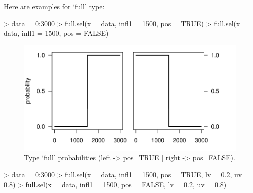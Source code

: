 \documentclass[letterpaper, 12pt]{article}
\begin{document}

\newpage

Here are examples for `full' type:
\begin{Schunk}
\begin{Sinput}
> data = 0:3000
> full.sel(x = data, infl1 = 1500, pos = TRUE)
> full.sel(x = data, infl1 = 1500, pos = FALSE)
\end{Sinput}
\end{Schunk}

\begin{figure}[h]
\vspace{-20pt}
\begin{center}
\includegraphics{relation_sel-005}
\end{center}
\vspace{-30pt}
\caption{Type `full' probabilities (left -> pos=TRUE |  right -> pos=FALSE).}
\vspace{-10pt}
\label{fig2}
\end{figure}

\begin{Schunk}
\begin{Sinput}
> data = 0:3000
> full.sel(x = data, infl1 = 1500, pos = TRUE, lv = 0.2, uv = 0.8)
> full.sel(x = data, infl1 = 1500, pos = FALSE, lv = 0.2, uv = 0.8)
\end{Sinput}
\end{Schunk}
\end{document}

